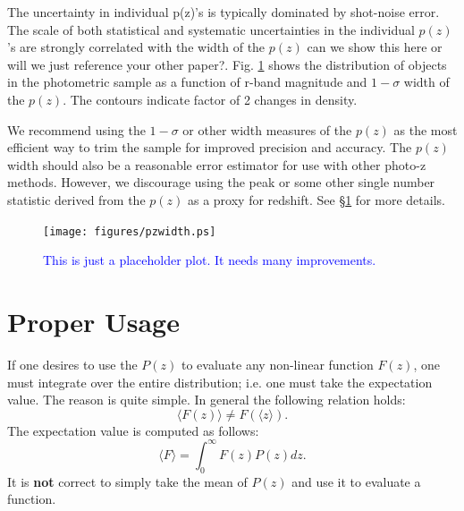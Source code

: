 \documentclass[preprint]{aastex}
\begin{document}
The uncertainty in individual p(z)'s is typically dominated by shot-noise
error.  The scale of both statistical and systematic uncertainties in the
individual $p(z)$'s are strongly correlated with the width of the $p(z)$
{\color{red} can we show this here or will we just reference your other
paper?}.  Fig.  \ref{fig:pzwidth} shows the distribution of objects in the
photometric sample as a function of r-band magnitude and $1-\sigma$ width of
the $p(z)$.  The contours indicate factor of 2 changes in density.  

We recommend using the $1-\sigma$ or other width measures of the $p(z)$ as the
most efficient way to trim the sample for improved precision and accuracy.  The
$p(z)$ width should also be a reasonable error estimator for use with other
photo-z methods.  However, we discourage using the peak or some other single
number statistic derived from the $p(z)$ as a proxy for redshift. See 
\S \ref{sec:usage} for more details.

\begin{figure}[!t]\centering
    \texttt{[image: figures/pzwidth.ps]}
    \caption{\textcolor{blue}{This is just a placeholder plot. It needs many improvements.}}
    \label{fig:pzwidth}

    \vspace{2em}
\end{figure}

\section{Proper Usage} \label{sec:usage}

If one desires to use the $P(z)$ to evaluate any non-linear function $F(z)$,
one must integrate over the entire distribution; i.e. one must take the
expectation value.  The reason is quite simple. In general the following
relation holds:
\begin{equation}
\langle F(z) \rangle \ne F(\langle z \rangle).
\end{equation}
The expectation value is computed as follows:
\begin{equation}
\langle F \rangle = \int_{0}^{\infty} F(z) P(z) dz.
\end{equation}
It is {\bf not} correct to simply take the mean of $P(z)$ and use it to evaluate
a function.
\end{document}
